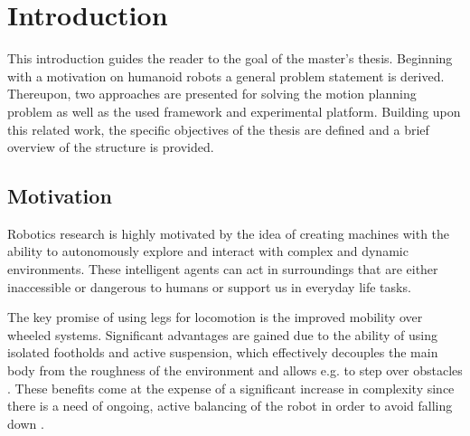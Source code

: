 
\chapter{Introduction}\label{c1}
This introduction guides the reader to the goal of the master's thesis. Beginning with a motivation on humanoid robots a general problem statement is derived. Thereupon, two approaches are presented for solving the motion planning problem as well as the used framework and experimental platform. Building upon this related work, the specific objectives of the thesis are defined and a brief overview of the structure is provided.

\section{Motivation}\label{sec:IntroMotivation}
Robotics research is highly motivated by the idea of creating machines with the ability to autonomously explore and interact with complex and dynamic environments. These intelligent agents can act in surroundings that are either inaccessible or dangerous to humans or support us in everyday life tasks. 
 
The key promise of using legs for locomotion is the improved mobility over wheeled systems. Significant advantages are gained due to the ability of using isolated footholds and active suspension, which effectively decouples the main body from the roughness of the environment and allows e.g. to step over obstacles \cite{raibert1986legged}. These benefits come at the expense of a significant increase in complexity since there is a need of ongoing, active balancing of the robot in order to avoid falling down \cite{wieber2016modeling}.

